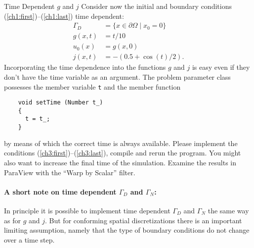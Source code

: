 \documentclass[12pt,a4paper]{article}
\begin{document}
\begin{Exercise}{Time Dependent $g$ and $j$}
  Consider now the initial and boundary conditions
  (\ref{ch1:first})--(\ref{ch1:last}) time dependent:
  \begin{align}
    \label{ch3:first}
    \Gamma_D &= \{ x\in\partial\Omega \mid x_0 = 0 \} \\
    g(x,t) &= t/10 \\
    u_0(x) &= g(x,0) \\
    \label{ch3:last}
    j(x,t) &= -(0.5 + \cos(t)/2) .
  \end{align}
  Incorporating the time dependence into the functions $g$ and $j$ is
  easy even if they don't have the time variable as an argument. The
  problem parameter class possesses the member variable \lstinline!t!
  and the member function
  \begin{lstlisting}
    void setTime (Number t_)
    {
      t = t_;
    }
  \end{lstlisting}
  by means of which the correct time is always available. Please
  implement the conditions (\ref{ch3:first})--(\ref{ch3:last}), compile
  and rerun the program. You might also want to increase the final time
  of the simulation. Examine the results in ParaView with the ``Warp by
  Scalar'' filter.
  \paragraph{A short note on time dependent $\Gamma_D$ and $\Gamma_N$:}
  In principle it is possible to implement time dependent $\Gamma_D$ and
  $\Gamma_N$ the same way as for $g$ and $j$. But for conforming spatial
  discretizations there is an important limiting assumption, namely that
  the type of boundary conditions do not change over a time step.
\end{Exercise}
\end{document}
